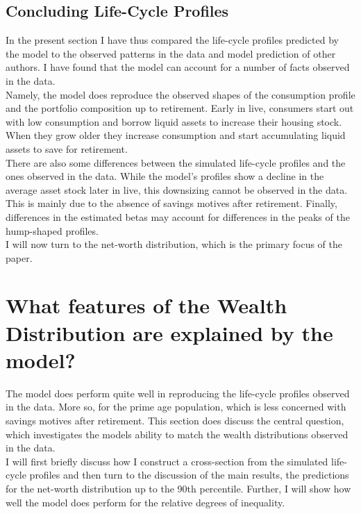 \documentclass[a4paper,12pt,legno]{article}
\begin{document}
\subsection{Concluding Life-Cycle Profiles}
In the present section I have thus compared the life-cycle profiles predicted by the model to the observed patterns in the data and model prediction of other authors. I have found that the model can account for a number of facts observed in the data. \\ Namely, the model does reproduce the observed shapes of the consumption profile and the portfolio composition up to retirement. Early in live, consumers start out with low consumption and borrow liquid assets to increase their housing stock. When they grow older they increase consumption and start accumulating liquid assets to save for retirement. \\
There are also some differences between the simulated life-cycle profiles and the ones observed in the data. While the model's profiles show a decline in the average asset stock later in live, this downsizing cannot be observed in the data. This is mainly due to the absence of savings motives after retirement. Finally, differences in the estimated betas may account for differences in the peaks of the hump-shaped profiles.\\ 
I will now turn to the net-worth distribution, which is the primary focus of the paper. 

\section{What features of the Wealth Distribution are explained by the model?}
\label{Chapter5}
The model does perform quite well in reproducing the life-cycle profiles observed in the data. More so, for the prime age population, which is less concerned with savings motives after retirement. This section does discuss the central question, which investigates the models ability to match the wealth distributions observed in the data.\\
I will first briefly discuss how I construct a cross-section from the simulated life-cycle profiles and then turn to the discussion of the main results, the predictions for the net-worth distribution up to the 90th percentile. Further, I will show how well the model does perform for the relative degrees of inequality. 
\end{document}
